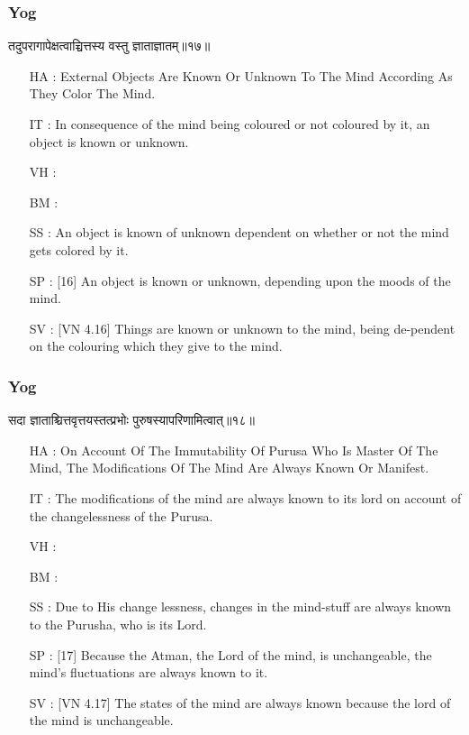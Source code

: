 \begin{frame}[fragile]\frametitle{Yog}
\begin{sanskrit}
तदुपरागापेक्षत्वाच्चित्तस्य वस्तु ज्ञाताज्ञातम्॥१७॥
\end{sanskrit}

	\begin{itemize}
	\item [HA]: External Objects Are Known Or Unknown To The Mind According As They Color The Mind.
	\item [IT]: In consequence of the mind being coloured or not coloured by it, an object is known or unknown.
	\item [VH]: 
	\item [BM]: 
	\item [SS]: An object is known of unknown dependent on whether or not the mind gets colored by it.
	\item [SP]: [16] An object is known or unknown, depending upon the moods of the mind.
	\item [SV]: [VN 4.16] Things are known or unknown to the mind, being de-pendent on the colouring which they give to the mind. 
	\end{itemize}
\end{frame}


\begin{frame}[fragile]\frametitle{Yog}
\begin{sanskrit}
सदा ज्ञाताश्चित्तवृत्तयस्तत्प्रभोः पुरुषस्यापरिणामित्वात्॥१८॥
\end{sanskrit}

	\begin{itemize}
	\item [HA]: On Account Of The Immutability Of Purusa Who Is Master Of The Mind, The Modifications Of The Mind Are Always Known Or Manifest.
	\item [IT]: The modifications of the mind are always known to its lord on account of the changelessness of the Purusa.
	\item [VH]: 
	\item [BM]: 
	\item [SS]: Due to His change lessness, changes in the mind-stuff are always known to the Purusha, who is its Lord.
	\item [SP]: [17] Because the Atman, the Lord of the mind, is unchangeable, the mind’s fluctuations are always known to it.
	\item [SV]: [VN 4.17] The states of the mind are always known because the lord of the mind is unchangeable.
	\end{itemize}
\end{frame}



